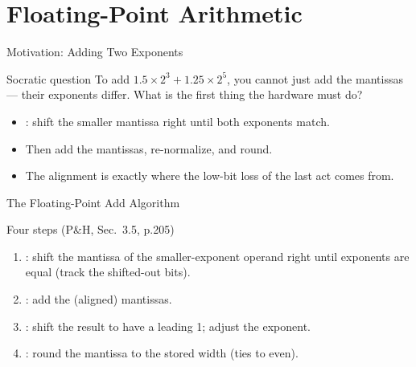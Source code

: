 \documentclass[aspectratio=169]{beamer}
\begin{document}

\section{Floating-Point Arithmetic}

\begin{frame}{Motivation: Adding Two Exponents}
  \begin{block}{Socratic question}
    To add $1.5 \times 2^3 + 1.25 \times 2^5$, you cannot just add the
    mantissas --- their exponents differ. What is the first thing the hardware
    must do?
  \end{block}
  \begin{itemize}
    \item {}: shift the smaller mantissa right until both
      exponents match.
    \item Then add the mantissas, re-normalize, and round.
    \item The alignment is exactly where the low-bit loss of the last act
      comes from.
  \end{itemize}
\end{frame}

\begin{frame}{The Floating-Point Add Algorithm}
  \begin{block}{Four steps (P\&H, Sec.~3.5, p.205) \cite{PattersonHennessy2017_computer_organization_design}}
    \begin{enumerate}
      \item {}: shift the mantissa of the smaller-exponent operand
        right until exponents are equal (track the shifted-out bits).
      \item {}: add the (aligned) mantissas.
      \item {}: shift the result to have a leading 1; adjust the
        exponent.
      \item {}: round the mantissa to the stored width (ties to even).
    \end{enumerate}
  \end{block}
  \vspace{0.2cm}
\end{frame}
\end{document}
